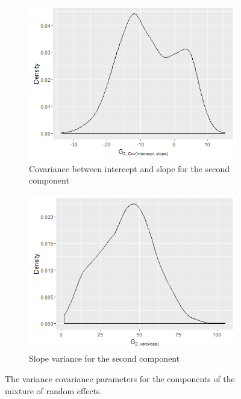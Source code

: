 \begin{figure}[!htb]
\begin{subfigure}[b]{0.4\textwidth}
		\includegraphics[width=\textwidth]{mainmatter/chapter_6_blood_donor/G12_2.png}	
          \caption{\label{fig : cov_blood_donor_12_2} Covariance between intercept and slope for the second component}
	\end{subfigure}
	\begin{subfigure}[b]{0.4\textwidth}
		\includegraphics[width=\textwidth]{mainmatter/chapter_6_blood_donor/G22_2.png}	
          \caption{\label{fig : cov_blood_donor_22_2}Slope variance for the second component}
	\end{subfigure}	


	\caption{The variance covariance parameters for the components of the mixture of random effects.}
	\label{fig : cov_blood_donor}    
\end{figure} 